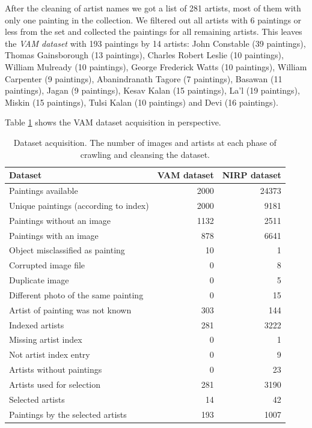 \documentclass[11pt,a4paper,twoside,openright,draft]{report}
\begin{document}
\begin{multicols}{2}
After the cleaning of artist names we got a list of 281 artists, most of them
with only one painting in the collection.  We filtered out all artists with 6
paintings or less from the set and collected the paintings for all remaining
artists.  This leaves the \emph{VAM dataset} with 193 paintings by 14 artists:
John Constable (39 paintings), Thomas Gainsborough (13 paintings), Charles
Robert Leslie (10 paintings), William Mulready (10 paintings), George Frederick
Watts (10 paintings), William Carpenter (9 paintings), Abanindranath Tagore (7
paintings), Basawan (11 paintings), Jagan (9 paintings), Kesav Kalan (15
paintings), La'l (19 paintings), Miskin (15 paintings), Tulsi Kalan (10
paintings) and Devi (16 paintings).

Table \ref{tab:crawl} shows the VAM dataset acquisition in perspective.

\begin{table}[ptb]
\centering
{}
\begin{tabular}{|l|rr|}
\toprule
Dataset & VAM dataset & NIRP dataset \\
\midrule
Paintings available                   & 2000 & 24373 \\
Unique paintings (according to index) & 2000 &  9181 \\
Paintings without an image            & 1132 &  2511 \\
Paintings with an image               &  878 &  6641 \\
Object misclassified as painting      &   10 &     1 \\
Corrupted image file                  &    0 &     8 \\
Duplicate image                       &    0 &     5 \\
Different photo of the same painting  &    0 &    15 \\
Artist of painting was not known      &  303 &   144 \\
\midrule
Indexed artists                       &  281 &  3222 \\
Missing artist index                  &    0 &     1 \\
Not artist index entry                &    0 &     9 \\
Artists without paintings             &    0 &    23 \\
Artists used for selection            &  281 &  3190 \\
Selected artists                      &   14 &    42 \\
\midrule
Paintings by the selected artists     &  193 &  1007 \\
\bottomrule
\end{tabular}
\caption[Dataset acquisition]{Dataset acquisition.  The number of images and
artists at each phase of crawling and cleansing the dataset.}
\label{tab:crawl}
\end{table}


\end{multicols}
\end{document}
